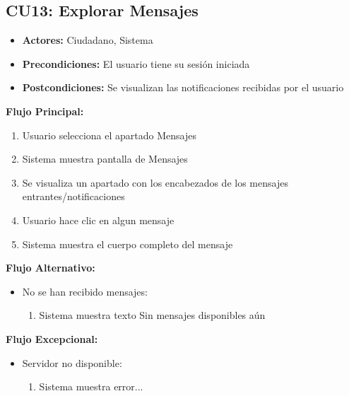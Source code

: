 \begin{multicols}{2}
\subsection*{CU13: Explorar Mensajes}
\begin{itemize}
    \item \textbf{Actores:} Ciudadano, Sistema
    \item \textbf{Precondiciones:} El usuario tiene su sesión iniciada
    \item \textbf{Postcondiciones:} Se visualizan las notificaciones recibidas por el usuario
\end{itemize}
\textbf{Flujo Principal:}
\begin{enumerate}
    \item Usuario selecciona el apartado Mensajes
    \item Sistema muestra pantalla de Mensajes
    \item Se visualiza un apartado con los encabezados de los mensajes entrantes/notificaciones
    \item Usuario hace clic en algun mensaje
    \item Sistema muestra el cuerpo completo del mensaje
\end{enumerate}

\textbf{Flujo Alternativo:}
\begin{itemize}
    \item No se han recibido mensajes:
    \begin{enumerate}
        \item Sistema muestra texto Sin mensajes disponibles aún
    \end{enumerate}
\end{itemize}

\textbf{Flujo Excepcional:}
\begin{itemize}
    \item Servidor no disponible:
    \begin{enumerate}
        \item Sistema muestra error...
    \end{enumerate}
\end{itemize}


\end{multicols}
